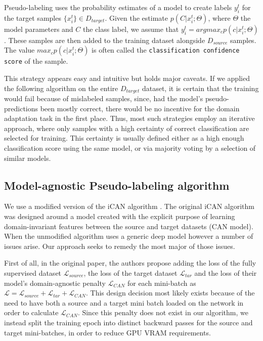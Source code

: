 \documentclass{article}
\newcommand{\loss}{\mathcal{L}}
\begin{document}
	Pseudo-labeling uses the probability estimates of a model to create labels $y_i^t$ for the target samples $\{x_i^t\} \in D_{target}$. Given the estimate $p(C | x_i^t; \Theta)$, where $\Theta$ the model parameters and $C$ the class label, we assume that $y_i^t = argmax_c{p(c | x_i^t; \Theta)}$. These samples are then added to the training dataset alongside $D_{source}$ samples. The value $max_c{p(c | x_i^t; \Theta)}$ is often called the \texttt{classification confidence score} of the sample. 
	
	This strategy appears easy and intuitive but holds major caveats. If we applied the following algorithm on the entire $D_{target}$ dataset, it is certain that the training would fail because of mislabeled samples, since, had the model's pseudo-predictions been mostly correct, there would be no incentive for the domain adaptation task in the first place. Thus, most such strategies employ an iterative approach, where only samples with a high certainty of correct classification are selected for training. This certainty is usually defined either as a high enough classification score using the same model, or via majority voting by a selection of similar models.
	
	
	\subsection{Model-agnostic Pseudo-labeling algorithm}
	\label{ssec:our-algorithm}
	
	We use a modified version of the iCAN algorithm \cite{ican}. The original iCAN algorithm was designed around a model created with the explicit purpose of learning domain-invariant features between the source and target datasets (CAN model). When the unmodified algorithm uses a generic deep model however a number of issues arise. Our approach seeks to remedy the most major of those issues.
	
	First of all, in the original paper, the authors propose adding the loss of the fully supervised dataset $\loss_{source}$, the loss of the target dataset $\loss_{tar}$ and the loss of their model's domain-agnostic penalty $\loss_{CAN}$ for each mini-batch as $\loss = \loss_{source} + \loss_{tar} + \loss_{CAN}$. This design decision most likely exists because of the need to have both a source and a target mini batch loaded on the network in order to calculate $\loss_{CAN}$. Since this penalty does not exist in our algorithm, we instead split the training epoch into distinct backward passes for the source and target mini-batches, in order to reduce GPU VRAM requirements.
	
\end{document}
